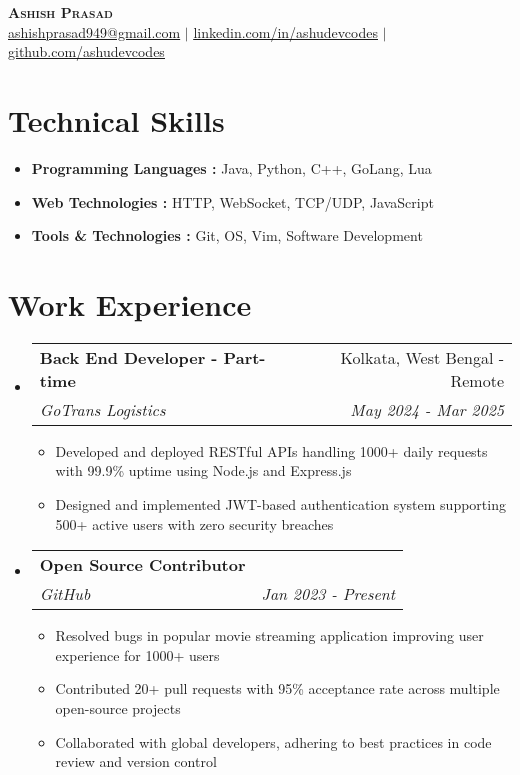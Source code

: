 \documentclass[letterpaper,11pt]{article}
\makeatletter
\newcommand{\resumeItem}[1]{
  \item\small{
    {#1 \vspace{-2pt}}
  }
}
\newcommand{\resumeSubheading}[4]{
  \vspace{-2pt}\item
    \begin{tabular*}{0.97\textwidth}[t]{l@{\extracolsep{\fill}}r}
      \textbf{#1} & #2 \\
      \textit{\small#3} & \textit{\small #4} \\
    \end{tabular*}\vspace{-7pt}
}
\newcommand{\resumeSubHeadingListStart}{\begin{itemize}[leftmargin=0.15in, label={}]}
\newcommand{\resumeSubHeadingListEnd}{\end{itemize}}
\newcommand{\resumeItemListStart}{\begin{itemize}}
\newcommand{\resumeItemListEnd}{\end{itemize}\vspace{-5pt}}
\makeatother
\begin{document}
\begin{center}
    \textbf{\Huge \scshape Ashish Prasad} \\ \vspace{10pt}
    \small \href{mailto:email@example.com}{{ashishprasad949@gmail.com}} $|$ 
    \href{https://www.linkedin.com/in/ashudevcodes/}{{\underline{linkedin.com/in/ashudevcodes}}} $|$
    \href{https://github.com/ashudevcodes}{{\underline{github.com/ashudevcodes}}}    
\end{center}

\section{Technical Skills}
    \resumeItemListStart
        \resumeItem{\textbf{Programming Languages : }{Java, Python, C++, GoLang, Lua}}
        \resumeItem{\textbf{Web Technologies : }{HTTP, WebSocket, TCP/UDP, JavaScript}}
        \resumeItem{\textbf{Tools \& Technologies : }{Git, OS, Vim, Software Development}}
\resumeItemListEnd

\section{Work Experience}
  \resumeSubHeadingListStart

  \resumeSubheading
    {Back End Developer - Part-time}{Kolkata, West Bengal - Remote}
    {GoTrans Logistics }{May 2024 - Mar 2025}
        \resumeItemListStart
            \resumeItem{Developed and deployed RESTful APIs handling 1000+ daily requests with 99.9\% uptime using Node.js and Express.js}
            \resumeItem{Designed and implemented JWT-based authentication system supporting 500+ active users with zero security breaches}
        \resumeItemListEnd
        
\resumeSubheading
    {Open Source Contributor}{}
    {GitHub}{Jan 2023 - Present}
        \resumeItemListStart
            \resumeItem{Resolved bugs in popular movie streaming application improving user experience for 1000+ users}
            \resumeItem{Contributed 20+ pull requests with 95\% acceptance rate across multiple open-source projects}
            \resumeItem{Collaborated with global developers, adhering to best practices in code review and version control}
        \resumeItemListEnd
  \resumeSubHeadingListEnd
\end{document}
